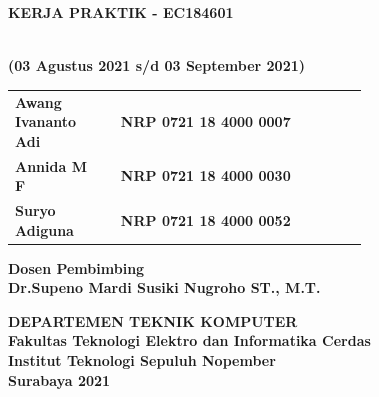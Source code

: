 \begin{flushleft}

  \sffamily\color{white}

  \noindent\textbf{KERJA PRAKTIK - EC184601}
  \vspace{4ex}

   \\
  \textbf{(03 Agustus 2021 s/d 03 September 2021)}
  \vspace{6ex}

  \vspace{6ex}

  \begin{adjustwidth}{-2mm}{}
    \begin{tabular}{lcp{0.7\linewidth}}
      \textbf{Awang Ivananto Adi} & & \textbf{NRP 0721 18 4000 0007} \\
      \textbf{Annida M F} & & \textbf{NRP 0721 18 4000 0030} \\
      \textbf{Suryo Adiguna} & & \textbf{NRP 0721 18 4000 0052} \\
    \end{tabular}
  \end{adjustwidth}
  \vspace{4ex}

  \noindent\textbf{Dosen Pembimbing} \\
  \textbf{Dr.Supeno Mardi Susiki Nugroho ST., M.T.}
  \vspace{10ex}

  \noindent\textbf{DEPARTEMEN TEKNIK KOMPUTER} \\
  \textbf{Fakultas Teknologi Elektro dan Informatika Cerdas} \\
  \textbf{Institut Teknologi Sepuluh Nopember} \\
  \textbf{Surabaya 2021}

\end{flushleft}

\restoregeometry
